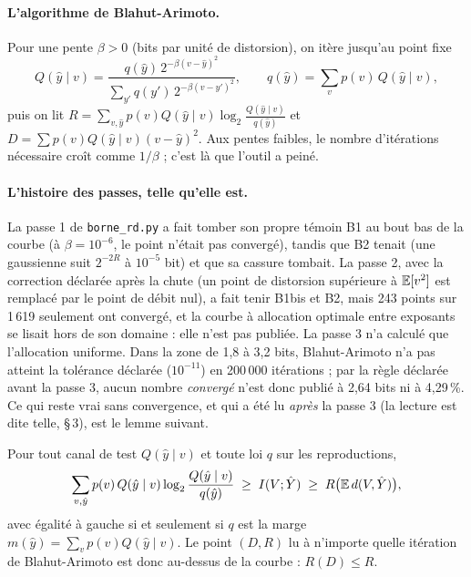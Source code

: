 \paragraph{L'algorithme de Blahut-Arimoto.} Pour une pente $\beta > 0$ (bits par unité de distorsion), on itère jusqu'au point fixe~\cite{blahut1972}
\begin{equation}\label{t3que:eq:ba}
Q(\hat y \mid v) = \frac{q(\hat y)\, 2^{-\beta (v - \hat y)^2}}{\sum_{y'} q(y')\, 2^{-\beta (v - y')^2}}, \qquad q(\hat y) = \sum_v p(v)\, Q(\hat y \mid v),
\end{equation}
puis on lit $R = \sum_{v, \hat y} p(v) Q(\hat y\mid v) \log_2 \frac{Q(\hat y\mid v)}{q(\hat y)}$ et $D = \sum p(v) Q(\hat y\mid v)(v - \hat y)^2$. Aux pentes faibles, le nombre d'itérations nécessaire croît comme $1/\beta$ ; c'est là que l'outil a peiné.

\paragraph{L'histoire des passes, telle qu'elle est.} La passe 1 de \texttt{borne\_rd.py} a fait tomber son propre témoin B1 au bout bas de la courbe (à $\beta = 10^{-6}$, le point n'était pas convergé), tandis que B2 tenait (une gaussienne suit $2^{-2R}$ à $10^{-5}$ bit) et que sa cassure tombait. La passe 2, avec la correction déclarée après la chute (un point de distorsion supérieure à $\mathbb{E}[v^2]$ est remplacé par le point de débit nul), a fait tenir B1bis et B2, mais 243 points sur 1\,619 seulement ont convergé, et la courbe à allocation optimale entre exposants se lisait hors de son domaine : elle n'est pas publiée. La passe 3 n'a calculé que l'allocation uniforme. Dans la zone de 1,8 à 3,2 bits, Blahut-Arimoto n'a pas atteint la tolérance déclarée ($10^{-11}$) en 200\,000 itérations ; par la règle déclarée avant la passe 3, aucun nombre \emph{convergé} n'est donc publié à 2,64 bits ni à 4,29\,\%. Ce qui reste vrai sans convergence, et qui a été lu \emph{après} la passe 3 (la lecture est dite telle,  §\,3), est le lemme suivant.

\begin{lemme}\label{t3que:lem:ba}
Pour tout canal de test $Q(\hat y \mid v)$ et toute loi $q$ sur les reproductions,
\begin{equation}\label{t3que:eq:ba-borne}
\sum_{v, \hat y} p(v)\, Q(\hat y\mid v) \log_2 \frac{Q(\hat y\mid v)}{q(\hat y)} \;\ge\; I(V ; \hat Y) \;\ge\; R\bigl(\mathbb{E}\, d(V, \hat Y)\bigr),
\end{equation}
avec égalité à gauche si et seulement si $q$ est la marge $m(\hat y) = \sum_v p(v) Q(\hat y \mid v)$. Le point $(D, R)$ lu à n'importe quelle itération de Blahut-Arimoto est donc au-dessus de la courbe : $R(D) \le R$.
\end{lemme}

